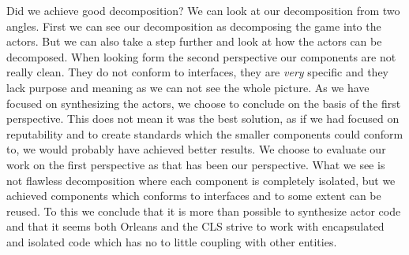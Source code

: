 Did we achieve good decomposition? We can look at our decomposition from two angles. First we can see our decomposition as decomposing the game into the actors. But we can also take a step further and look at how the actors can be decomposed. When looking form the second perspective our components are not really clean. They do not conform to interfaces, they are \textit{very} specific and they lack purpose and meaning as we can not see the whole picture. As we have focused on synthesizing the actors, we choose to conclude on the basis of the first perspective. This does not mean it was the best solution, as if we had focused on reputability and to create standards which the smaller components could conform to, we would probably have achieved better results. We choose to evaluate our work on the first perspective as that has been our perspective. What we see is not flawless decomposition where each component is completely isolated, but we achieved components which conforms to interfaces and to some extent can be reused. To this we conclude that it is more than possible to synthesize actor code and that it seems both Orleans and the CLS strive to work with encapsulated and isolated code which has no to little coupling with other entities.